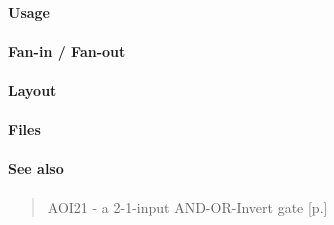 \paragraph{Usage}

\paragraph{Fan-in / Fan-out}

\paragraph{Layout}

\paragraph{Files}

\paragraph{See also}
\begin{quote}
    AOI21 - a 2-1-input AND-OR-Invert gate [p.\pageref{AOI21}]
\end{quote}
